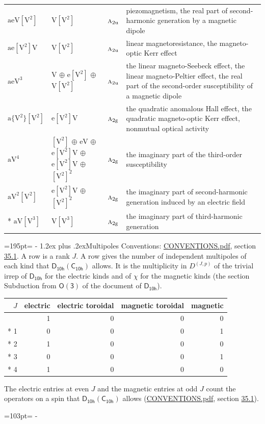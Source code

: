 \documentclass[10pt,a4paper]{article}
\makeatletter
\renewcommand\section{\@startsection{section}{1}{\z@}{-3ex plus -1ex minus -.2ex}%
  {1.2ex plus .2ex}{\normalfont\large\sffamily\bfseries\color{parttitle}}}
\newcommand{\needspace}[1]{\par\penalty-100\begingroup\dimen0=#1\relax\dimen2=\pagegoal
  \advance\dimen2-\pagetotal\ifdim\dimen0>\dimen2\relax\ifdim\dimen2>0pt\vfil\break\fi\fi
  \endgroup}
\numberwithin{equation}{section}
\newcommand{\grp}[1]{\mathsf{#1}}
\newcommand{\irr}[1]{\text{\normalfont\scshape #1}}
\newcommand{\ptag}[1]{\mathrm{#1}}
\newcommand{\irrJp}[2]{D^{(#1,#2)}}
\newcommand{\jahn}[1]{\mathrm{#1}}
\newlength{\fillwidth}\newlength{\cellwidth}\newlength{\colwidth}
\makeatother
\begin{document}
{\begin{longtable}{@{}lll>{\RaggedRight\arraybackslash}p{\fillwidth}@{}}
$\jahn{aeV[V^{2}]}$ & $\jahn{V[V^{2}]}$ & $\irr{a}_{2\ptag{u}}$ & piezomagnetism, the real part of second-harmonic generation by a magnetic dipole\\
$\jahn{ae[V^{2}]V}$ & $\jahn{V[V^{2}]}$ & $\irr{a}_{2\ptag{u}}$ & linear magnetoresistance, the magneto-optic Kerr effect\\
$\jahn{aeV^{3}}$ & $\jahn{V}$ $\oplus$ $\jahn{e[V^{2}]}$ $\oplus$ $\jahn{V[V^{2}]}$ & $\irr{a}_{2\ptag{u}}$ & the linear magneto-Seebeck effect, the linear magneto-Peltier effect, the real part of the second-order susceptibility of a magnetic dipole\\
$\jahn{a\{V^{2}\}[V^{2}]}$ & $\jahn{e[V^{2}]V}$ & $\irr{a}_{2\ptag{g}}$ & the quadratic anomalous Hall effect, the quadratic magneto-optic Kerr effect, nonmutual optical activity\\
$\jahn{aV^{4}}$ & $\jahn{[V^{2}]}$ $\oplus$ $\jahn{eV}$ $\oplus$ $\jahn{e[V^{2}]V}$ $\oplus$ $\jahn{e[V^{2}]V}$ $\oplus$ $\jahn{[V^{2}]^{2}}$ & $\irr{a}_{2\ptag{g}}$ & the imaginary part of the third-order susceptibility\\
$\jahn{aV^{2}[V^{2}]}$ & $\jahn{e[V^{2}]V}$ $\oplus$ $\jahn{[V^{2}]^{2}}$ & $\irr{a}_{2\ptag{g}}$ & the imaginary part of second-harmonic generation induced by an electric field\\*
$\jahn{aV[V^{3}]}$ & $\jahn{V[V^{3}]}$ & $\irr{a}_{2\ptag{g}}$ & the imaginary part of third-harmonic generation\\
\bottomrule\end{longtable}}
\needspace{195pt}
\section{Multipoles}\label{s:multipoles}
Conventions: \href{../../CONVENTIONS.pdf}{CONVENTIONS.pdf}, section \href{../../CONVENTIONS.pdf\#conv.35.1}{35.1}.
A row is a rank $J$. \label{n:head.multipole.electric}\label{n:head.multipole.electric.toroidal}\label{n:head.multipole.magnetic.toroidal}\label{n:head.multipole.magnetic}A row gives the number of independent multipoles of each kind that $\grp{D_{10h}}(\grp{C_{10h}})$ allows. It is the multiplicity in $\irrJp{J}{p}$ of the trivial irrep of $\grp{D_{10h}}$ for the electric kinds and of $\chi$ for the magnetic kinds (the section Subduction from $\grp{O(3)}$ of the document of \href{../../../rotation/data/pdf/D10h.pdf}{$\grp{D_{10h}}$}).
{\small\begin{longtable}{@{}rrrrr@{}}\toprule
$J$ & electric & electric toroidal & magnetic toroidal & magnetic\\\midrule\endhead
\bottomrule\endfoot\endlastfoot
0 & 1 & 0 & 0 & 0\\*
1 & 0 & 0 & 0 & 1\\*
2 & 1 & 0 & 0 & 0\\*
3 & 0 & 0 & 0 & 1\\*
4 & 1 & 0 & 0 & 0\\
\bottomrule\end{longtable}}
The electric entries at even $J$ and the magnetic entries at odd $J$ count the operators on a spin that $\grp{D_{10h}}(\grp{C_{10h}})$ allows (\href{../../CONVENTIONS.pdf}{CONVENTIONS.pdf}, section \href{../../CONVENTIONS.pdf\#conv.35.1}{35.1}).
\needspace{103pt}
\end{document}
